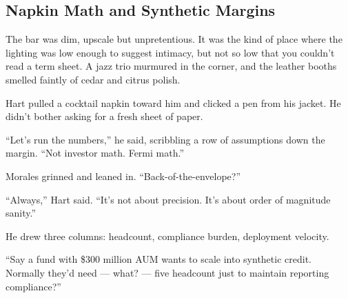 
\subsection{Napkin Math and Synthetic Margins}

The bar was dim, upscale but unpretentious. It was the kind of place where the lighting was low enough to suggest intimacy, 
but not so low that you couldn’t read a term sheet. A jazz trio murmured in the corner, and the leather booths smelled 
faintly of cedar and citrus polish.

Hart pulled a cocktail napkin toward him and clicked a pen from his jacket. He didn’t bother asking for a fresh sheet of paper.

``Let’s run the numbers,'' he said, scribbling a row of assumptions down the margin. ``Not investor math. 
Fermi math.''

Morales grinned and leaned in. ``Back-of-the-envelope?''

``Always,'' Hart said. ``It’s not about precision. It’s about order of magnitude sanity.''

He drew three columns: headcount, compliance burden, deployment velocity.

``Say a fund with \$300 million AUM wants to scale into synthetic credit. Normally they’d need --- what? --- five 
headcount just to maintain reporting compliance?''

\medskip

